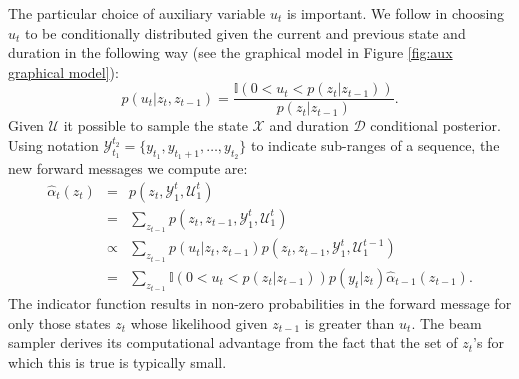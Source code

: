 
The particular choice of auxiliary variable $u_t$ is important.  We follow  \cite{vanGael2008} in choosing $u_t$ to be conditionally distributed given the current and previous state and duration in the following way (see the graphical model in Figure \ref{fig:aux graphical model}):
\begin{equation}
    \label{eqn:slice}
    p(u_t | z_t, z_{t-1}) = 
    \frac
    {\mathbb{I}(0 < u_t < p(z_t | z_{t-1}))} 
    {p(z_t | z_{t-1})}.
\end{equation}
Given $\mathcal{U}$ it possible to sample the state $\mathcal{X}$ and duration $\mathcal{D}$ conditional posterior. 
Using notation $\mathcal{Y}_{t_1}^{t_2} = \{y_{t_1}, y_{t_1+1}, \ldots,y_{t_2}\}$  to indicate sub-ranges of a sequence, the new forward messages we compute are:
\begin{eqnarray}
   \hat{\alpha}_t(z_t) &=& 
   p(z_t, \mathcal{Y}_1^t , \mathcal{U}_1^{t})   \label{eqn:scaled forward} \\
   &=& 
   \sum_{z_{t-1}}
   p(z_t, z_{t-1} , \mathcal{Y}_1^t , \mathcal{U}_1^{t}) \nonumber \\
   &\propto& 
   \sum_{z_{t-1}}
   p(u_{t} | z_t, z_{t-1})
   p(z_t, z_{t-1} , \mathcal{Y}_1^t, \mathcal{U}_1^{t-1}) \nonumber \\
   &=& 
   \sum_{z_{t-1}}
   \mathbb{I}(0 < u_{t} < p(z_t | z_{t-1}))
   p(y_t|z_t) \hat{\alpha}_{t-1}(z_{t-1}) \nonumber.
\end{eqnarray}
The indicator function results in non-zero probabilities in the forward message for only those states $z_t$ whose likelihood given $z_{t-1}$ is greater than $u_t$. The beam sampler derives its computational advantage from the fact that the set of $z_t$'s for which this is true is typically small. 
